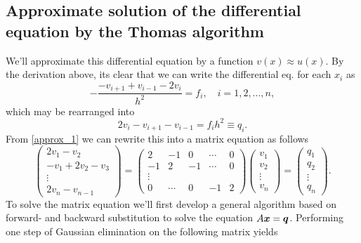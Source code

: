 \documentclass[english,notitlepage]{revtex4-1}  %
\begin{document}
\subsection{Approximate solution of the differential equation by the Thomas algorithm}
We'll approximate this differential equation by a function $v(x) \approx u(x)$. By the derivation above, its clear that we can write the differential eq. for each $x_i$ as 
\begin{equation}
	-\frac{-v_{i+1}+v_{i-1} - 2v_i}{h^2} = f_i, \quad i=1,2,...,n,
\end{equation}
which may be rearranged into 
\begin{equation}\label{approx_1}
	2v_i - v_{i+1} - v_{i-1} = f_ih^2 \equiv q_i.
\end{equation}
From \eqref{approx_1} we can rewrite this into a matrix equation as follows 
\begin{equation}
	\begin{pmatrix}
	2v_1 - v_2 \\ 
	-v_1 + 2v_2 - v_3 \\ 
	\vdots \\
	2v_n - v_{n-1}
	\end{pmatrix}
	=
	\begin{pmatrix}
	2 & -1 & 0  & \cdots & 0 \\
	-1 & 2 & -1 & \cdots & 0 \\
	\vdots \\
	0 & \cdots & 0 & -1 & 2 
	\end{pmatrix}
	\begin{pmatrix}
	v_1 \\ v_2 \\ \vdots \\ v_n
	\end{pmatrix}
	= \begin{pmatrix}
	q_1 \\ q_2 \\ \vdots \\ q_n
	\end{pmatrix}.
\end{equation}
To solve the matrix equation we'll first develop a general algorithm based on forward- and backward substitution to solve the equation $A\vb*{x} = \vb*{q}$. 
Performing one step of Gaussian elimination on the following matrix yields 
\end{document}
